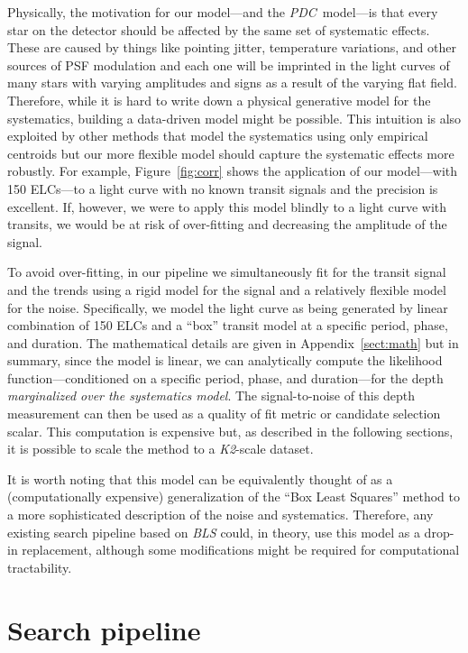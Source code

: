 \documentclass[12pt,preprint]{aastex}
\newcommand{\project}[1]{\textsl{#1}} %
\newcommand{\KT}{\project{K2}}
\newcommand{\pdc}{\project{PDC}}
\newcommand{\figref}[1]{\ref{fig:#1}}
\newcommand{\Fig}[1]{Figure~\figref{#1}}
\newcommand{\App}[1]{Appendix~\ref{sect:#1}}
\newcommand{\app}[1]{\App{#1}}
\newcommand{\sectlabel}[1]{\label{sect:#1}}
\begin{document}
Physically, the motivation for our model---and the \pdc\ model---is that every
star on the detector should be affected by the same set of systematic effects.
These are caused by things like pointing jitter, temperature variations, and
other sources of PSF modulation and each one will be imprinted in the light
curves of many stars with varying amplitudes and signs as a result of the
varying flat field.
Therefore, while it is hard to write down a physical generative model for the
systematics, building a data-driven model might be possible.
This intuition is also exploited by other methods that model the systematics
using only empirical centroids \citep{Vanderburg:2014, Aigrain:2015,
Crossfield:2015} but our more flexible model should capture the systematic
effects more robustly.
For example, \Fig{corr} shows the application of our model---with 150
ELCs---to a light curve with no known transit signals and the precision is
excellent.
If, however, we were to apply this model blindly to a light curve with
transits, we would be at risk of over-fitting and decreasing the amplitude of
the signal.

To avoid over-fitting, in our pipeline we simultaneously fit for the transit
signal and the trends using a rigid model for the signal and a relatively
flexible model for the noise.
Specifically, we model the light curve as being generated by linear
combination of 150 ELCs and a ``box'' transit model at a specific period,
phase, and duration.
The mathematical details are given in \app{math} but in summary, since the
model is linear, we can analytically compute the likelihood
function---conditioned on a specific period, phase, and duration---for the
depth \emph{marginalized over the systematics model}.
The signal-to-noise of this depth measurement can then be used as a quality
of fit metric or candidate selection scalar.
This computation is expensive but, as described in the following sections, it
is possible to scale the method to a \KT-scale dataset.

It is worth noting that this model can be equivalently thought of as a
(computationally expensive) generalization of the ``Box Least Squares''
\citep[\project{BLS};][]{bls} method to a more sophisticated description of
the noise and systematics.
Therefore, any existing search pipeline based on \project{BLS} could, in
theory, use this model as a drop-in replacement, although some modifications
might be required for computational tractability.


\section{Search pipeline}
\sectlabel{search}
\end{document}
